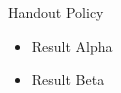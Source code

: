 \documentclass[14pt,t,handout]{beamer}
\begin{document}
\begin{frame}{Handout Policy}
\begin{itemize}
\item<1-> Result Alpha
\item<2-> Result Beta
\end{itemize}
\end{frame}
\end{document}
